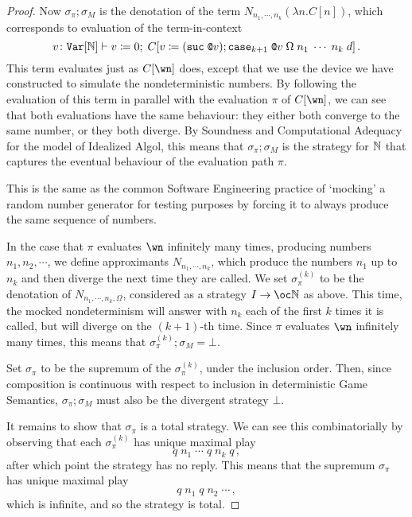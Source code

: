 \documentclass{article}
\begin{document}
\begin{proof}
  Now $\sigma_\pi;\sigma_M$ is the denotation of the term $N_{n_1,\cdots,n_k}(\lambda n.C[n])$, which corresponds to evaluation of the term-in-context
  \[
    v\colon{\mathtt{Var}}[\mathbb{N}]\vdash v\coloneqq 0;\;C[v\coloneqq ({\mathtt{suc\;}}\texttt{@} v); {\mathtt{case}}_{k+1}\;\texttt{@} v\;\Omega\;n_1\;\cdots\;n_k\;d]\,.
    \]
  This term evaluates just as $C[\wn]$ does, except that we use the device we have constructed to simulate the nondeterministic numbers.  
  By following the evaluation of this term in parallel with the evaluation $\pi$ of $C[\wn]$, we can see that both evaluations have the same behaviour: they either both converge to the same number, or they both diverge.  
  By Soundness and Computational Adequacy for the model of Idealized Algol, this means that $\sigma_\pi;\sigma_M$ is the strategy for $\mathbb{N}$ that captures the eventual behaviour of the evaluation path $\pi$.

  \begin{remark}
    This is the same as the common Software Engineering practice of `mocking' a random number generator for testing purposes by forcing it to always produce the same sequence of numbers.
  \end{remark}

  In the case that $\pi$ evaluates $\wn$ infinitely many times, producing numbers $n_1,n_2,\cdots$, we define approximants $N_{n_1,\cdots,n_k}$, which produce the numbers $n_1$ up to $n_k$ and then diverge the next time they are called.  
  We set $\sigma_\pi^{(k)}$ to be the denotation of $N_{n_1,\cdots,n_k,\Omega}$, considered as a strategy $I \to \oc \bN$ as above.  
  This time, the mocked nondeterminism will answer with $n_k$ each of the first $k$ times it is called, but will diverge on the $(k + 1)$-th time.
  Since $\pi$ evaluates $\wn$ infinitely many times, this means that $\sigma_\pi^{(k)};\sigma_M=\bot$.

  Set $\sigma_\pi$ to be the supremum of the $\sigma_\pi^{(k)}$, under the inclusion order.  
  Then, since composition is continuous with respect to inclusion in deterministic Game Semantics, $\sigma_\pi;\sigma_M$ must also be the divergent strategy $\bot$.

  It remains to show that $\sigma_\pi$ is a total strategy.  
  We can see this combinatorially by observing that each $\sigma_\pi^{(k)}$ has unique maximal play
  \[
    q\;n_1\;\cdots\;q\;n_k\;q\,,
    \]
  after which point the strategy has no reply.  
  This means that the supremum $\sigma_\pi$ has unique maximal play
  \[
    q\;n_1\;q\;n_2\;\cdots\,,
    \]
  which is infinite, and so the strategy is total.
\end{proof}
\end{document}
